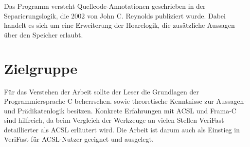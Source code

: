 Das Programm versteht Quellcode-Annotationen geschrieben in der Separierungslogik, die 2002 von John C. Reynolds publiziert
wurde\cite{reynolds-2002}. Dabei handelt es sich um eine Erweiterung der Hoarelogik, die zusätzliche Aussagen über den Speicher
erlaubt. 


\section{Zielgruppe}
\label{sec:zielgruppe}

Für das Verstehen der Arbeit sollte der Leser die Grundlagen der Programmiersprache C beherrschen.
sowie theoretische Kenntnisse zur Aussagen- und Prädikatenlogik besitzen.
Konkrete Erfahrungen mit ACSL und Frama-C sind hilfreich, da beim Vergleich der Werkzeuge an vielen
Stellen VeriFast detaillierter als ACSL erläutert wird. Die Arbeit ist darum auch als Einstieg in VeriFast
für ACSL-Nutzer geeignet und ausgelegt.

 

